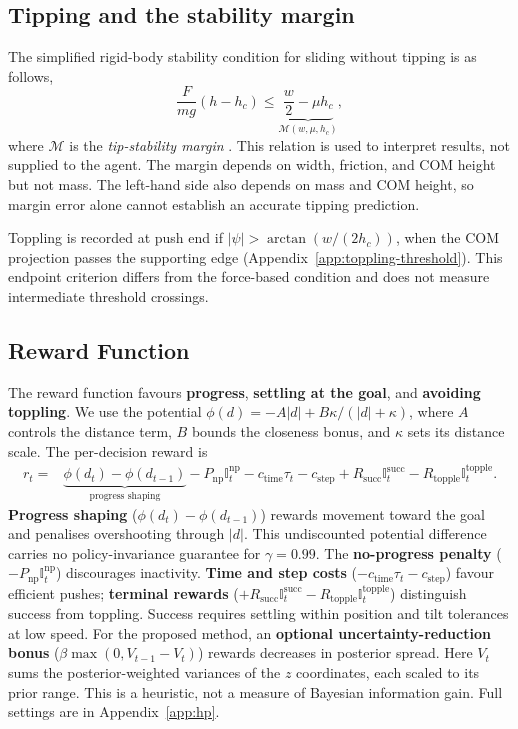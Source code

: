 \documentclass[12pt]{article}
\newcommand{\indic}{\mathbb{I}}
\begin{document}
\subsection{Tipping and the stability margin}\label{sec:topple}
The simplified rigid-body stability condition for sliding without tipping is as follows,
\begin{equation}\frac{F}{mg}(h-h_c)\leq\underbrace{\frac{w}{2}-\mu h_c}_{\mathcal M(w,\mu,h_c)},\label{eq:topple}\end{equation}
where $\mathcal M$ is the \emph{tip-stability margin} \cite{hibbeler2022}. This relation is used to interpret results, not supplied to the agent. The margin depends on width, friction, and COM height but not mass. The left-hand side also depends on mass and COM height, so margin error alone cannot establish an accurate tipping prediction.

Toppling is recorded at push end if $|\psi|>\arctan(w/(2h_c))$, when the COM projection passes the supporting edge (Appendix~\ref{app:toppling-threshold}). This endpoint criterion differs from the force-based condition and does not measure intermediate threshold crossings.

\subsection{Reward Function}\label{sec:reward}
The reward function favours \textbf{progress}, \textbf{settling at the goal}, and \textbf{avoiding toppling}. We use the potential $\phi(d)=-A|d|+B\kappa/(|d|+\kappa)$, where $A$ controls the distance term, $B$ bounds the closeness bonus, and $\kappa$ sets its distance scale. The per-decision reward is
\begin{equation}\begin{aligned}
r_t={}&\underbrace{\phi(d_t)-\phi(d_{t-1})}_{\text{progress shaping}}-P_{\mathrm{np}}\indic_t^{\mathrm{np}} -c_{\mathrm{time}}\tau_t-c_{\mathrm{step}}+R_{\mathrm{succ}}\indic_t^{\mathrm{succ}}-R_{\mathrm{topple}}\indic_t^{\mathrm{topple}}.
\end{aligned}\label{eq:reward}\end{equation}
\textbf{Progress shaping} ($\phi(d_t)-\phi(d_{t-1})$) rewards movement toward the goal and penalises overshooting through $|d|$. This undiscounted potential difference carries no policy-invariance guarantee for $\gamma=0.99$. The \textbf{no-progress penalty} ($-P_{\mathrm{np}}\indic_t^{\mathrm{np}}$) discourages inactivity. \textbf{Time and step costs} ($-c_{\mathrm{time}}\tau_t-c_{\mathrm{step}}$) favour efficient pushes; \textbf{terminal rewards} ($+R_{\mathrm{succ}}\indic_t^{\mathrm{succ}}-R_{\mathrm{topple}}\indic_t^{\mathrm{topple}}$) distinguish success from toppling. Success requires settling within position and tilt tolerances at low speed. For the proposed method, an \textbf{optional uncertainty-reduction bonus} ($\beta\max(0,V_{t-1}-V_t)$) rewards decreases in posterior spread. Here $V_t$ sums the posterior-weighted variances of the $z$ coordinates, each scaled to its prior range. This is a heuristic, not a measure of Bayesian information gain. Full settings are in Appendix~\ref{app:hp}.
\end{document}
